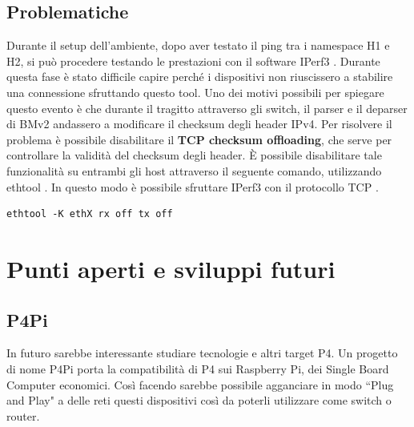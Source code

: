 \subsection*{Problematiche}
Durante il setup dell'ambiente, dopo aver testato il ping tra i namespace H1 e H2, si può procedere testando le prestazioni con il software IPerf3 \cite{noauthor_iperf_nodate}. Durante questa fase è stato difficile capire perché i dispositivi non riuscissero a stabilire una connessione sfruttando questo tool. Uno dei motivi possibili per spiegare questo evento è che durante il tragitto attraverso gli switch, il parser e il deparser di BMv2 andassero a modificare il checksum degli header IPv4. Per risolvere il problema è possibile disabilitare il \textbf{TCP checksum offloading}, che serve per controllare la validità del checksum degli header.
È possibile disabilitare tale funzionalità su entrambi gli host attraverso il seguente comando, utilizzando ethtool \cite{noauthor_ethtool8_nodate}. In questo modo è possibile sfruttare IPerf3 con il protocollo TCP \cite{noauthor_cant_nodate}.
\begin{verbatim}
ethtool -K ethX rx off tx off
\end{verbatim}
\pagebreak
\section*{Punti aperti e sviluppi futuri}

\subsection*{P4Pi}
In futuro sarebbe interessante studiare tecnologie e altri target P4. Un progetto di nome P4Pi \cite{noauthor_getting_2022} porta la compatibilità di P4 sui Raspberry Pi, dei Single Board Computer economici. Così facendo sarebbe possibile agganciare in modo ``Plug and Play" a delle reti questi dispositivi così da poterli utilizzare come switch o router.\\

